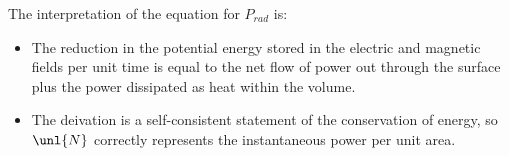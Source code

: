 \documentclass[a4paper, 11pt, normalem]{report}
\begin{document}
The interpretation of the equation for $P_{rad}$ is:
\begin{itemize}
	\item The reduction in the potential energy stored in the electric and magnetic fields per unit time is equal to the net flow of power out through the surface plus the power dissipated as heat within the volume.
	\item The deivation is a self-consistent statement of the conservation of energy, so $\unl{N}$ correctly represents the instantaneous power per unit area.
\end{itemize}
\end{document}
